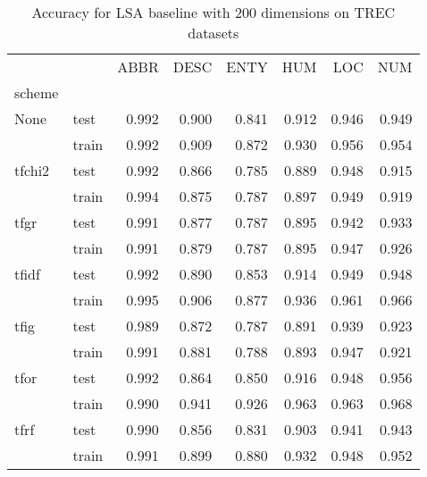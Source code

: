 \begin{table}[h]
\begin{center}

\begin{tabular}{llrrrrrr}
\toprule
{} &  &  ABBR &  DESC &  ENTY &  HUM &  LOC &  NUM \\
scheme &  &       &       &       &      &      &      \\
\midrule
None & test &     0.992 &     0.900 &     0.841 &    0.912 &    0.946 &    0.949 \\
{} & train &     0.992 &     0.909 &     0.872 &    0.930 &    0.956 &    0.954 \\
tfchi2 & test &     0.992 &     0.866 &     0.785 &    0.889 &    0.948 &    0.915 \\
{} & train &     0.994 &     0.875 &     0.787 &    0.897 &    0.949 &    0.919 \\
tfgr & test &     0.991 &     0.877 &     0.787 &    0.895 &    0.942 &    0.933 \\
{} & train &     0.991 &     0.879 &     0.787 &    0.895 &    0.947 &    0.926 \\
tfidf & test &     0.992 &     0.890 &     0.853 &    0.914 &    0.949 &    0.948 \\
{} & train &     0.995 &     0.906 &     0.877 &    0.936 &    0.961 &    0.966 \\
tfig & test &     0.989 &     0.872 &     0.787 &    0.891 &    0.939 &    0.923 \\
{} & train &     0.991 &     0.881 &     0.788 &    0.893 &    0.947 &    0.921 \\
tfor & test &     0.992 &     0.864 &     0.850 &    0.916 &    0.948 &    0.956 \\
{} & train &     0.990 &     0.941 &     0.926 &    0.963 &    0.963 &    0.968 \\
tfrf & test &     0.990 &     0.856 &     0.831 &    0.903 &    0.941 &    0.943 \\
{} & train &     0.991 &     0.899 &     0.880 &    0.932 &    0.948 &    0.952 \\
\bottomrule
\end{tabular}

\caption[Accuracy for LSA baseline with 200 dimensions on TREC datasets]{Accuracy for LSA baseline with 200 dimensions on TREC datasets}
\label{tab:lsa:resuts:abs:200:TREC}
\end{center}
\end{table}






